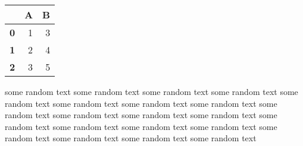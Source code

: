 \documentclass[11pt]{article}
\begin{document}
\begin{multicols}{3}
\begin{minipage}{1.0\linewidth}
\centering
{}
\label{figure}
\end{minipage}

\columnbreak


\begin{center}

\label{example}
\begin{tabular}{lrr}
\toprule
\textbf{} & \textbf{A} & \textbf{B} \\
\midrule
\arrayrulecolor{black}\textbf{0} & 1 & 3 \\
\textbf{1} & 2 & 4 \\
\textbf{2} & 3 & 5 \\
\bottomrule
\end{tabular}

\end{center}


\columnbreak

some random text some random text some random text some random text some random text some random text some random text some random text some random text some random text some random text some random text some random text some random text some random text some random text some random text some random text some random text some random text 
\end{multicols}
\end{document}
